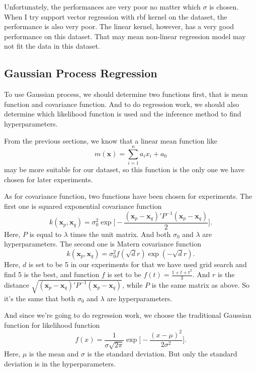 \documentclass[a4paper]{article}
\newcommand{\bfx}{\mathbf{x}}
\begin{document}
Unfortunately, the performances are very poor no matter which $\sigma$ is chosen. When I try support vector regression with rbf kernel on the dataset, the performance is also very poor. The linear kernel, however, has a very good performance on this dataset. That may mean non-linear regression model  may not fit the data in this dataset.

\subsection{Gaussian Process Regression}
To use Gaussian process, we should determine two functions first, that is mean function and covariance function. And to do regression work, we should also determine which likelihood function is used and the inference method to find hyperparameters.

From the previous sections, we know that a linear mean function like
\begin{equation}
m(\bfx)=\sum_{i=1}^n a_ix_i + a_0
\end{equation}
may be more suitable for our dataset, so this function is the only one we have chosen for later experiments.

As for covariance function, two functions have been chosen for experiments. The first one is squared exponential covariance function
\begin{equation}
k(\bfx_p,\bfx_q)=\sigma_0^2\exp\Big[-\frac{(\bfx_p-\bfx_q)'P^{-1}(\bfx_p-\bfx_q)}{2}\Big].
\end{equation}
Here, $P$ is equal to $\lambda$ times the unit matrix. And both $\sigma_0$ and $\lambda$ are hyperparameters. The second one is Matern covariance function
\begin{equation}
k(\bfx_p,\bfx_q)=\sigma_0^2f(\sqrt{d}r)\exp(-\sqrt{d}r).
\end{equation}
Here, $d$ is set to be 5 in our experiments for that we have used grid search and find 5 is the best, and function $f$ is set to be $f(t)=\frac{1+t+t^2}{3}$. And $r$ is the distance $\sqrt{(\bfx_p-\bfx_q)'P^{-1}(\bfx_p-\bfx_q)}$, while $P$ is the same matrix as above. So it's the same that both $\sigma_0$ and $\lambda$ are hyperparameters.

And since we're going to do regression work, we choose the traditional Gaussian function for likelihood function
\begin{equation}
f(x)=\frac{1}{\sigma\sqrt{2\pi}} \exp\Big[ -\frac{(x-\mu)^2}{2\sigma^2} \Big].
\end{equation}
Here, $\mu$ is the mean and $\sigma$ is the standard deviation. But only the standard deviation is in the hyperparameters.
\end{document}
